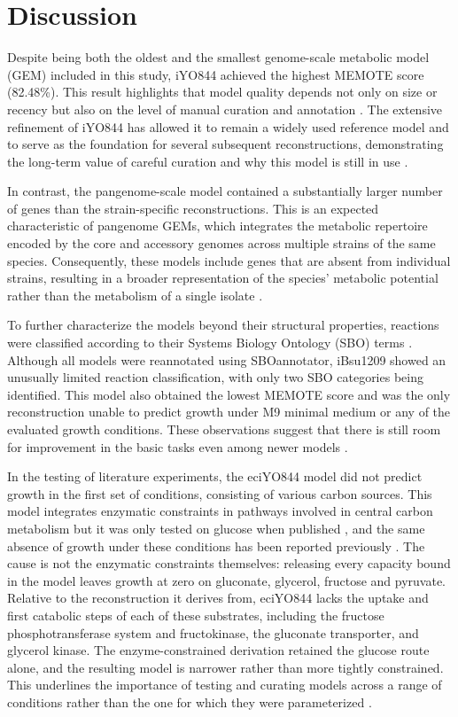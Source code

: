 \documentclass[11pt, a4paper]{article}
\begin{document}
\section{Discussion}

Despite being both the oldest and the smallest genome-scale metabolic model (GEM) included in this study, iYO844 achieved the highest MEMOTE score (82.48\%). This result highlights that model quality depends not only on size or recency but also on the level of manual curation and annotation \parencite{monk-2014}. The extensive refinement of iYO844 has allowed it to remain a widely used reference model and to serve as the foundation for several subsequent reconstructions, demonstrating the long-term value of careful curation and why this model is still in use \parencite{tibocha-bonilla-2022,massaiu-2019,neal-2024}. %

In contrast, the pangenome-scale model contained a substantially larger number of genes than the strain-specific reconstructions. This is an expected characteristic of pangenome GEMs, which integrates the metabolic repertoire encoded by the core and accessory genomes across multiple strains of the same species. Consequently, these models include genes that are absent from individual strains, resulting in a broader representation of the species' metabolic potential rather than the metabolism of a single isolate \parencite{guerra-2026}.

To further characterize the models beyond their structural properties, reactions were classified according to their Systems Biology Ontology (SBO) terms \parencite{bauerle-2023}. Although all models were reannotated using SBOannotator, iBsu1209 showed an unusually limited reaction classification, with only two SBO categories being identified. This model also obtained the lowest MEMOTE score and was the only reconstruction unable to predict growth under M9 minimal medium or any of the evaluated growth conditions. These observations suggest that there is still room for improvement in the basic tasks even among newer models \parencite{obrien-2015}.


In the testing of literature experiments, the eciYO844 model did not predict growth in the first set of conditions, consisting of various carbon sources. This model integrates enzymatic constraints in pathways involved in central carbon metabolism but it was only tested on glucose when published \parencite{massaiu-2019}, and the same absence of growth under these conditions has been reported previously \parencite{wu-2023}. The cause is not the enzymatic constraints themselves: releasing every capacity bound in the model leaves growth at zero on gluconate, glycerol, fructose and pyruvate. Relative to the reconstruction it derives from, eciYO844 lacks the uptake and first catabolic steps of each of these substrates, including the fructose phosphotransferase system and fructokinase, the gluconate transporter, and glycerol kinase. The enzyme-constrained derivation retained the glucose route alone, and the resulting model is narrower rather than more tightly constrained. This underlines the importance of testing and curating models across a range of conditions rather than the one for which they were parameterized \parencite{paklao-2026}.
\end{document}
